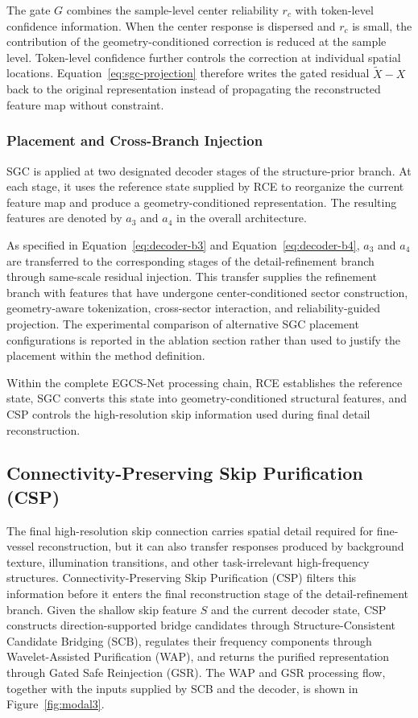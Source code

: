 \documentclass[a4paper,fleqn]{cas-sc}
\begin{document}
The gate \(G\) combines the sample-level center reliability \(r_c\) with token-level confidence information.
When the center response is dispersed and \(r_c\) is small, the contribution of the geometry-conditioned correction is reduced at the sample level.
Token-level confidence further controls the correction at individual spatial locations.
Equation~\eqref{eq:sgc-projection} therefore writes the gated residual \(\tilde{X}-X\) back to the original representation instead of propagating the reconstructed feature map without constraint.

\subsubsection{Placement and Cross-Branch Injection}

SGC is applied at two designated decoder stages of the structure-prior branch.
At each stage, it uses the reference state supplied by RCE to reorganize the current feature map and produce a geometry-conditioned representation.
The resulting features are denoted by \(a_3\) and \(a_4\) in the overall architecture.

As specified in Equation~\eqref{eq:decoder-b3} and Equation~\eqref{eq:decoder-b4}, \(a_3\) and \(a_4\) are transferred to the corresponding stages of the detail-refinement branch through same-scale residual injection.
This transfer supplies the refinement branch with features that have undergone center-conditioned sector construction, geometry-aware tokenization, cross-sector interaction, and reliability-guided projection.
The experimental comparison of alternative SGC placement configurations is reported in the ablation section rather than used to justify the placement within the method definition.

Within the complete EGCS-Net processing chain, RCE establishes the reference state, SGC converts this state into geometry-conditioned structural features, and CSP controls the high-resolution skip information used during final detail reconstruction.

\subsection{Connectivity-Preserving Skip Purification (CSP)}

The final high-resolution skip connection carries spatial detail required for fine-vessel reconstruction, but it can also transfer responses produced by background texture, illumination transitions, and other task-irrelevant high-frequency structures.
Connectivity-Preserving Skip Purification (CSP) filters this information before it enters the final reconstruction stage of the detail-refinement branch.
Given the shallow skip feature \(S\) and the current decoder state, CSP constructs direction-supported bridge candidates through Structure-Consistent Candidate Bridging (SCB), regulates their frequency components through Wavelet-Assisted Purification (WAP), and returns the purified representation through Gated Safe Reinjection (GSR).
The WAP and GSR processing flow, together with the inputs supplied by SCB and the decoder, is shown in Figure~\ref{fig:modal3}.
\end{document}
